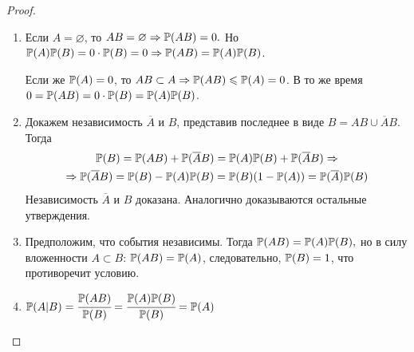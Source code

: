 \begin{proof}
\begin{enumerate} 
    \item Если $A = \varnothing$, то $AB = \varnothing \Rightarrow {\mathbb{P}(AB)} = 0.$ Но $ {\mathbb{P}(A)}{\mathbb{P}(B)} = 0 \cdot {\mathbb{P}(B)} = 0 \Rightarrow {\mathbb{P}(AB)} = {\mathbb{P}(A)} {\mathbb{P}(B)}$.
    
    Если же ${{\mathbb{P}(A)} = 0}$, то ${AB \subset A \Rightarrow \mathbb{P}(AB) \leqslant {\mathbb{P}(A)} = 0}$. В то же время ${0 = {\mathbb{P}(AB)} = 0 \cdot {\mathbb{P}(B)} = {\mathbb{P}(A)} {\mathbb{P}(B)}}$.

    \item Докажем независимость $\overline{A}$ и $B$, представив последнее в виде $B = AB \cup \overline{A}B$. Тогда
    \begin{multline*}
        {\mathbb{P}(B)} = {\mathbb{P}(AB)} + {\mathbb{P}(\overline{A}B)} = {\mathbb{P}(A)}{\mathbb{P}(B)} + {\mathbb{P}(\overline{A}B)} \Rightarrow \\
        \Rightarrow {\mathbb{P}(\overline{A}B)} = {\mathbb{P}(B)} - {\mathbb{P}(A)}{\mathbb{P}(B)} = {\mathbb{P}(B)} (1 - {\mathbb{P}(A)}) = {\mathbb{P}(\overline{A})}{\mathbb{P}(B)}
    \end{multline*}
    Независимость $\overline{A}$ и $B$ доказана. Аналогично доказываются остальные утверждения.
    \item Предположим, что события независимы. Тогда ${\mathbb{P}(AB)} = {\mathbb{P}(A)}{\mathbb{P}(B)},$ но в силу вложенности $A \subset B$: ${\mathbb{P}(AB)} = {\mathbb{P}(A)}$, следовательно, ${\mathbb{P}(B)} = 1$, что противоречит условию.
    \item ${\mathbb{P}(A | B)} = \cfrac{{\mathbb{P}(AB)}}{{\mathbb{P}(B)}} = \cfrac{{\mathbb{P}(A)}{\mathbb{P}(B)}}{{\mathbb{P}(B)}} = {\mathbb{P}(A)}$
\end{enumerate}
\end{proof}

